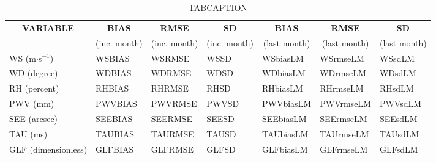 \begin{table}[]
\begin{center}
\begin{tabular}{|l|l|l|l|l|l|l|}
\hline
\multicolumn{1}{|c|}{\cellcolor[HTML]{C0C0C0}\textbf{VARIABLE}} & \multicolumn{1}{c|}{\cellcolor[HTML]{C0C0C0}\textbf{BIAS}} & \multicolumn{1}{c|}{\cellcolor[HTML]{C0C0C0}\textbf{RMSE}} & \multicolumn{1}{c|}{\cellcolor[HTML]{C0C0C0}\textbf{SD}} & \multicolumn{1}{c|}{\cellcolor[HTML]{C0C0C0}\textbf{BIAS}} & \multicolumn{1}{c|}{\cellcolor[HTML]{C0C0C0}\textbf{RMSE}} & \multicolumn{1}{c|}{\cellcolor[HTML]{C0C0C0}\textbf{SD}}\\
\multicolumn{1}{|c|}{\cellcolor[HTML]{C0C0C0}} & \multicolumn{1}{c|}{\cellcolor[HTML]{C0C0C0}(inc. month)} & \multicolumn{1}{c|}{\cellcolor[HTML]{C0C0C0}(inc. month)} & \multicolumn{1}{c|}{\cellcolor[HTML]{C0C0C0}(inc. month)} & \multicolumn{1}{c|}{\cellcolor[HTML]{C0C0C0}(last month)} & \multicolumn{1}{c|}{\cellcolor[HTML]{C0C0C0}(last month)} & \multicolumn{1}{c|}{\cellcolor[HTML]{C0C0C0}(last month)}\\\hline
\cellcolor[HTML]{C0C0C0}WS (m$\cdot$s$^{-1}$) & WSBIAS  & WSRMSE  & WSSD  & WSbiasLM     & WSrmseLM     & WSsdLM\\
\cellcolor[HTML]{C0C0C0}WD (degree)           & WDBIAS  & WDRMSE  & WDSD  & WDbiasLM     & WDrmseLM     & WDsdLM\\
\cellcolor[HTML]{C0C0C0}RH (percent)          & RHBIAS  & RHRMSE  & RHSD  & RHbiasLM     & RHrmseLM     & RHsdLM\\
\cellcolor[HTML]{C0C0C0}PWV (mm)              & PWVBIAS & PWVRMSE & PWVSD & PWVbiasLM    & PWVrmseLM    & PWVsdLM\\
\cellcolor[HTML]{C0C0C0}SEE (arcsec)          & SEEBIAS & SEERMSE & SEESD & SEEbiasLM    & SEErmseLM    & SEEsdLM\\
\cellcolor[HTML]{C0C0C0}TAU (ms)              & TAUBIAS & TAURMSE & TAUSD & TAUbiasLM    & TAUrmseLM    & TAUsdLM\\
\cellcolor[HTML]{C0C0C0}GLF (dimensionless)   & GLFBIAS & GLFRMSE & GLFSD & GLFbiasLM    & GLFrmseLM    & GLFsdLM\\
\hline
\end{tabular}
\caption{TABCAPTION}
\end{center}
\end{table}

